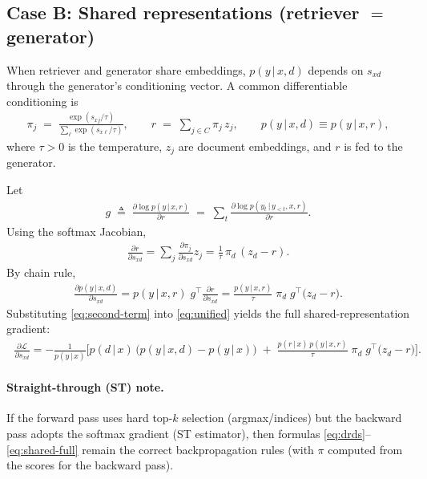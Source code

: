 \documentclass{applemlr}
\newcommand{\px}{p(y\,|\,x)}
\newcommand{\pd}{p(d\,|\,x)}
\newcommand{\qyd}{p(y\,|\,x,d)}
\newcommand{\sd}{s_{xd}}
\numberwithin{equation}{section}
\begin{document}
\subsection*{Case B: Shared representations (retriever $=$ generator)}
When retriever and generator share embeddings, $\qyd$ depends on $\sd$ through the generator's conditioning vector. A common differentiable conditioning is
\begin{align}
\pi_j \;=\; \frac{\exp(s_{xj}/\tau)}{\sum_{\ell}\exp(s_{x\ell}/\tau)},
\qquad
r \;=\; \sum_{j\in C} \pi_j\, z_j,
\qquad
\qyd \equiv p(y\,|\,x,r),
\label{eq:mixture}
\end{align}
where $\tau>0$ is the temperature, $z_j$ are document embeddings, and $r$ is fed to the generator.

Let
\begin{align}
g \;\triangleq\; \frac{\partial \log p(y\,|\,x,r)}{\partial r}
\;=\; \sum_{t}\frac{\partial \log p(y_t\,|\,y_{<t},x,r)}{\partial r}.
\label{eq:gdef}
\end{align}
Using the softmax Jacobian,
\begin{align}
\frac{\partial r}{\partial \sd}
= \sum_{j}\frac{\partial \pi_j}{\partial \sd} z_j
= \frac{1}{\tau}\,\pi_d\,(z_d - r).
\label{eq:drds}
\end{align}
By chain rule,
\begin{align}
\boxed{\;
\frac{\partial \qyd}{\partial \sd}
= p(y\,|\,x,r)\; g^\top \frac{\partial r}{\partial \sd}
= \frac{p(y\,|\,x,r)}{\tau}\;\pi_d\; g^\top\big(z_d - r\big).
\;}
\label{eq:second-term}
\end{align}
Substituting \eqref{eq:second-term} into \eqref{eq:unified} yields the full shared-representation gradient:
\begin{align}
\boxed{\;
\frac{\partial \mathcal{L}}{\partial \sd}
= -\frac{1}{\px}\Big[
\pd\,\big(\qyd - \px\big)
\;+\;
\frac{p(r\,|\,x)\,p(y\,|\,x,r)}{\tau}\;\pi_d\; g^\top\big(z_d - r\big)
\Big].
\;}
\label{eq:shared-full}
\end{align}

\paragraph{Straight-through (ST) note.}
If the forward pass uses hard top-$k$ selection (argmax/indices) but the backward pass adopts the softmax gradient (ST estimator), then formulas
\eqref{eq:drds}--\eqref{eq:shared-full} remain the correct backpropagation rules (with $\pi$ computed from the scores for the backward pass).
\end{document}
